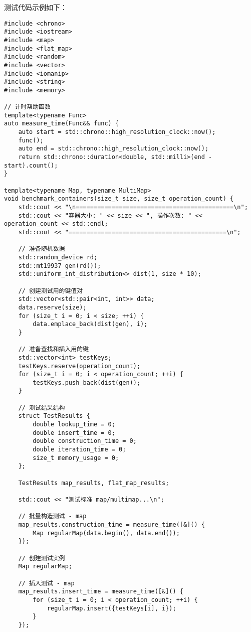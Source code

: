 \documentclass[a4paper, 12pt]{article}
\begin{document}
测试代码示例如下：

\begin{lstlisting}[style=cpp]
#include <chrono>
#include <iostream>
#include <map>
#include <flat_map>
#include <random>
#include <vector>
#include <iomanip>
#include <string>
#include <memory>

// 计时帮助函数
template<typename Func>
auto measure_time(Func&& func) {
    auto start = std::chrono::high_resolution_clock::now();
    func();
    auto end = std::chrono::high_resolution_clock::now();
    return std::chrono::duration<double, std::milli>(end - start).count();
}

template<typename Map, typename MultiMap>
void benchmark_containers(size_t size, size_t operation_count) {
    std::cout << "\n============================================\n";
    std::cout << "容器大小: " << size << ", 操作次数: " << operation_count << std::endl;
    std::cout << "============================================\n";
    
    // 准备随机数据
    std::random_device rd;
    std::mt19937 gen(rd());
    std::uniform_int_distribution<> dist(1, size * 10);
    
    // 创建测试用的键值对
    std::vector<std::pair<int, int>> data;
    data.reserve(size);
    for (size_t i = 0; i < size; ++i) {
        data.emplace_back(dist(gen), i);
    }
    
    // 准备查找和插入用的键
    std::vector<int> testKeys;
    testKeys.reserve(operation_count);
    for (size_t i = 0; i < operation_count; ++i) {
        testKeys.push_back(dist(gen));
    }
    
    // 测试结果结构
    struct TestResults {
        double lookup_time = 0;
        double insert_time = 0;
        double construction_time = 0;
        double iteration_time = 0;
        size_t memory_usage = 0;
    };
    
    TestResults map_results, flat_map_results;
    
    std::cout << "测试标准 map/multimap...\n";
    
    // 批量构造测试 - map
    map_results.construction_time = measure_time([&]() {
        Map regularMap(data.begin(), data.end());
    });
    
    // 创建测试实例
    Map regularMap;
    
    // 插入测试 - map
    map_results.insert_time = measure_time([&]() {
        for (size_t i = 0; i < operation_count; ++i) {
            regularMap.insert({testKeys[i], i});
        }
    });
    

\end{lstlisting}
\end{document}
